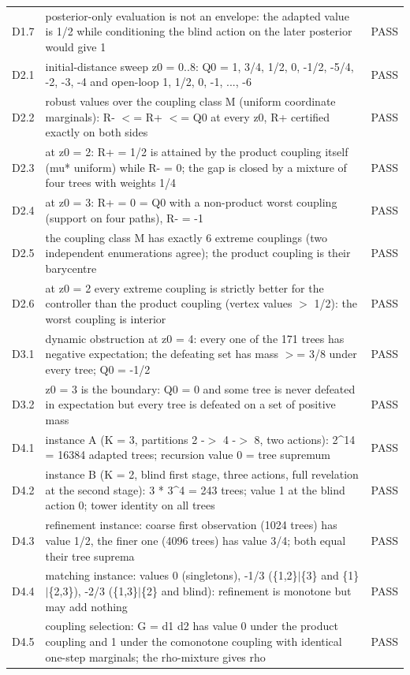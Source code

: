 \documentclass[11pt,a4paper]{article}
\theoremstyle{plain}
\theoremstyle{definition}
\theoremstyle{remark}
\begin{document}
\begin{footnotesize}
\begin{longtable}{p{1.1cm}p{12.6cm}p{0.9cm}}
D1.7 & posterior-only evaluation is not an envelope: the adapted value is 1/2 while conditioning the blind action on the later posterior would give 1 & PASS\\
D2.1 & initial-distance sweep z0 = 0..8: Q0 = 1, 3/4, 1/2, 0, -1/2, -5/4, -2, -3, -4 and open-loop 1, 1/2, 0, -1, ..., -6 & PASS\\
D2.2 & robust values over the coupling class M (uniform coordinate marginals): R- $<$= R+ $<$= Q0 at every z0, R+ certified exactly on both sides & PASS\\
D2.3 & at z0 = 2: R+ = 1/2 is attained by the product coupling itself (mu* uniform) while R- = 0; the gap is closed by a mixture of four trees with weights 1/4 & PASS\\
D2.4 & at z0 = 3: R+ = 0 = Q0 with a non-product worst coupling (support on four paths), R- = -1 & PASS\\
D2.5 & the coupling class M has exactly 6 extreme couplings (two independent enumerations agree); the product coupling is their barycentre & PASS\\
D2.6 & at z0 = 2 every extreme coupling is strictly better for the controller than the product coupling (vertex values $>$ 1/2): the worst coupling is interior & PASS\\
D3.1 & dynamic obstruction at z0 = 4: every one of the 171 trees has negative expectation; the defeating set has mass $>$= 3/8 under every tree; Q0 = -1/2 & PASS\\
D3.2 & z0 = 3 is the boundary: Q0 = 0 and some tree is never defeated in expectation but every tree is defeated on a set of positive mass & PASS\\
D4.1 & instance A (K = 3, partitions 2 -$>$ 4 -$>$ 8, two actions): 2\^{}14 = 16384 adapted trees; recursion value 0 = tree supremum & PASS\\
D4.2 & instance B (K = 2, blind first stage, three actions, full revelation at the second stage): 3 * 3\^{}4 = 243 trees; value 1 at the blind action 0; tower identity on all trees & PASS\\
D4.3 & refinement instance: coarse first observation (1024 trees) has value 1/2, the finer one (4096 trees) has value 3/4; both equal their tree suprema & PASS\\
D4.4 & matching instance: values 0 (singletons), -1/3 (\{1,2\}$|$\{3\} and \{1\}$|$\{2,3\}), -2/3 (\{1,3\}$|$\{2\} and blind): refinement is monotone but may add nothing & PASS\\
D4.5 & coupling selection: G = d1 d2 has value 0 under the product coupling and 1 under the comonotone coupling with identical one-step marginals; the rho-mixture gives rho & PASS\\

\end{longtable}
\end{footnotesize}
\end{document}
